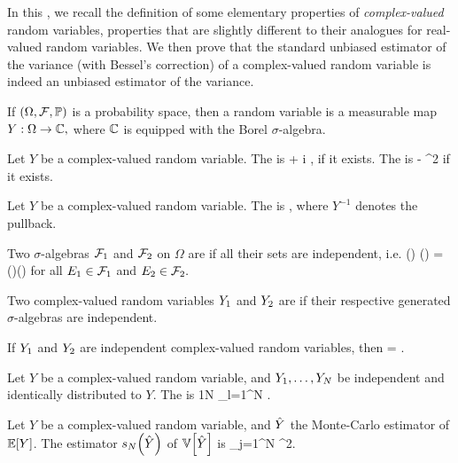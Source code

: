 In this , we recall the definition of some elementary properties of \emph{complex-valued} random variables, properties that are slightly different to their analogues for real-valued random variables. We then prove that the standard unbiased estimator of the variance (with Bessel's correction) of a complex-valued random variable  is indeed an unbiased estimator of the variance.

If $\OFP$ is a probability space, then a  random variable is a measurable map $Y:\Omega\rightarrow \mathbb C,$ where $\mathbb C$ is equipped with the Borel $\sigma$-algebra.
\ede

Let $Y$ be a complex-valued random variable. The  is
\beqs
{} \de {} + i ,
\eeqs
if it exists. The  is
\beqs
{} \de {} - ^2
\eeqs
if it exists.
\ede

Let $Y$ be a complex-valued random variable. The  is
\beqs
{} \de {},
\eeqs
where $Y^{-1}$ denotes the pullback.
\ede

Two $\sigma$-algebras $\mathcal F_{1}$ and $\mathcal F_{2}$ on $\Omega$ are  if all their sets are independent, i.e.
\beqs
\PP\mleft(\Eo\mright) \cap \PP\mleft(\Et\mright) = \PP\mleft(\Eo\mright)\PP\mleft(\Et\mright)
\eeqs
for all $E_{1} \in \mathcal F_{1}$ and $E_{2} \in \mathcal F_{2}.$
\ede

Two complex-valued random variables $Y_{1}$ and $Y_{2}$ are  if their respective generated $\sigma$-algebras are independent.
\ede

If $Y_{1}$ and $Y_{2}$ are independent complex-valued random variables, then
\beqs
\EXP{\Yo\Ytbar} = \EXP{\Yo}\EXP{\Ytbar}.
\eeqs
\ele

Let $Y$ be a complex-valued random variable, and $Y_{1},\ldots,Y_{N}$ be independent and identically distributed to $Y$. The  is
\beqs
\Yhat \de\frac1N \sum_{l=1}^N \Yl.
\eeqs
\ede

Let $Y$ be a complex-valued random variable, and $\hat{Y}$ the Monte-Carlo estimator of $\EXP{Y}$. The estimator $\unbiased{\Yhat}{N}$ of $\VAR{\Yhat}$ is
\beq\label{eq:unbiased}
 \de {} \sum_{j=1}^N \abs{\Yj - \Yhat}^2.
\eeq
\ede

